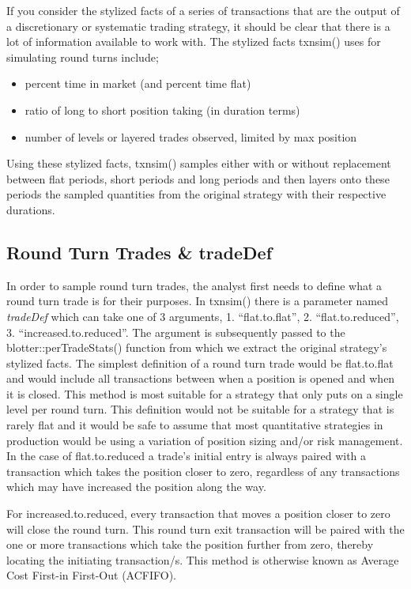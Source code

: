 If you consider the stylized facts of a series of transactions that are
the output of a discretionary or systematic trading strategy, it should
be clear that there is a lot of information available to work with. The
stylized facts txnsim() uses for simulating round turns include;

\begin{itemize}
\tightlist
\item
  percent time in market (and percent time flat)
\item
  ratio of long to short position taking (in duration terms)
\item
  number of levels or layered trades observed, limited by max position
\end{itemize}

Using these stylized facts, txnsim() samples either with or without
replacement between flat periods, short periods and long periods and
then layers onto these periods the sampled quantities from the original
strategy with their respective durations.

\hypertarget{round-turn-trades-tradedef}{%
\subsection{Round Turn Trades \&
tradeDef}\label{round-turn-trades-tradedef}}

In order to sample round turn trades, the analyst first needs to define
what a round turn trade is for their purposes. In txnsim() there is a
parameter named \emph{tradeDef} which can take one of 3 arguments, 1.
``flat.to.flat'', 2. ``flat.to.reduced'', 3. ``increased.to.reduced''.
The argument is subsequently passed to the blotter::perTradeStats()
function from which we extract the original strategy's stylized facts.
The simplest definition of a round turn trade would be flat.to.flat and
would include all transactions between when a position is opened and
when it is closed. This method is most suitable for a strategy that only
puts on a single level per round turn. This definition would not be
suitable for a strategy that is rarely flat and it would be safe to
assume that most quantitative strategies in production would be using a
variation of position sizing and/or risk management. In the case of
flat.to.reduced a trade's initial entry is always paired with a
transaction which takes the position closer to zero, regardless of any
transactions which may have increased the position along the way.

For increased.to.reduced, every transaction that moves a position closer
to zero will close the round turn. This round turn exit transaction will
be paired with the one or more transactions which take the position
further from zero, thereby locating the initiating transaction/s. This
method is otherwise known as Average Cost First-in First-Out (ACFIFO).

